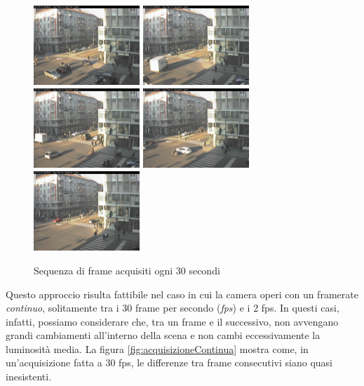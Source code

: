 \begin{figure}[tb]
	\includegraphics[width = 4cm]{./pictures/FPSbasso/image2698}
	\includegraphics[width = 4cm]{./pictures/FPSbasso/image2699}
	\includegraphics[width = 4cm]{./pictures/FPSbasso/image2700}
	\includegraphics[width = 4cm]{./pictures/FPSbasso/image2701}
	\includegraphics[width = 4cm]{./pictures/FPSbasso/image2702}
	\caption{Sequenza di frame acquisiti ogni 30 secondi}
	\label{fig:acquisizioneBassa}
\end{figure}
Questo approccio risulta fattibile nel caso in cui la camera operi con un framerate \textit{continuo}, solitamente tra i 30 frame per secondo (\textit{fps}) e i 2 fps. 
In questi casi, infatti, possiamo considerare che, tra un frame e il successivo, non avvengano grandi cambiamenti all'interno della scena e non cambi eccessivamente la luminosit\`a media.
La figura \ref{fig:acquisizioneContinua} mostra come, in un'acquisizione fatta a 30 fps, le differenze tra frame consecutivi siano quasi inesistenti. 
